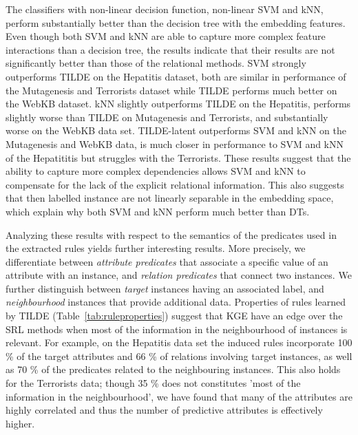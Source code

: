 The classifiers with non-linear decision function, non-linear SVM and kNN, perform substantially better than the decision tree with the embedding features.
Even though both SVM and kNN are able to capture more complex feature interactions than a decision tree, the results indicate that their results are not significantly better than those of the relational methods.
SVM strongly outperforms TILDE on the Hepatitis dataset, both are similar in performance of the Mutagenesis and Terrorists dataset while TILDE performs much better on the WebKB dataset.
kNN slightly outperforms TILDE on the Hepatitis, performs slightly worse than TILDE on Mutagenesis and Terrorists, and substantially worse on the WebKB data set.
TILDE-latent outperforms SVM and kNN on the Mutagenesis and WebKB data, is much closer in performance to SVM and kNN of the Hepatititis but struggles with the Terrorists.
These results suggest that the ability to capture more complex dependencies allows SVM and kNN to compensate for the lack of the explicit relational information.
This also suggests that then labelled instance are not linearly separable in the embedding space, which explain why both SVM and kNN perform much better than DTs.




Analyzing these results with respect to the semantics of the predicates used in the extracted rules yields further interesting results.
More precisely, we differentiate between \textit{attribute predicates} that associate a specific value of an attribute with an instance, and \textit{relation predicates} that connect two instances.
We further distinguish between \textit{target} instances having an associated label, and \textit{neighbourhood} instances that provide additional data.
Properties of rules learned by TILDE (Table~\ref{tab:ruleproperties}) suggest that KGE have an edge over the SRL methods when most of the information in the neighbourhood of instances is relevant.
For example, on the Hepatitis data set  the induced rules incorporate 100 \% of the target attributes and 66 \% of relations involving target instances, as well as 70 \% of the predicates related to the neighbouring instances.
This also holds for the Terrorists data; though 35 \% does not constitutes 'most of the information in the neighbourhood', we have found that many of the attributes are highly correlated and thus the number of predictive attributes is effectively higher.


